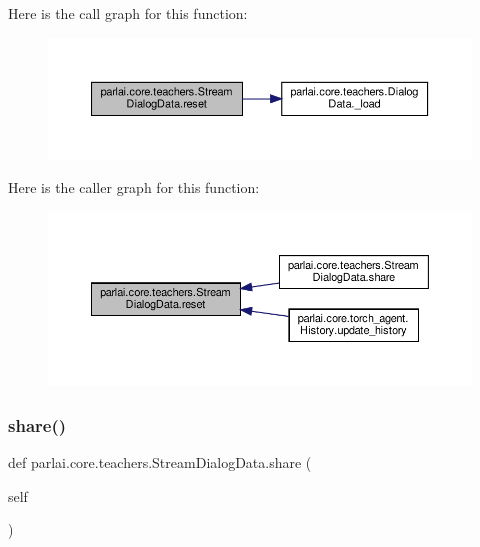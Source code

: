 Here is the call graph for this function\+:
\nopagebreak
\begin{figure}[H]
\begin{center}
\leavevmode
\includegraphics[width=350pt]{classparlai_1_1core_1_1teachers_1_1StreamDialogData_a6375bd13d685da4b3449caaafcc5ec13_cgraph}
\end{center}
\end{figure}
Here is the caller graph for this function\+:
\nopagebreak
\begin{figure}[H]
\begin{center}
\leavevmode
\includegraphics[width=350pt]{classparlai_1_1core_1_1teachers_1_1StreamDialogData_a6375bd13d685da4b3449caaafcc5ec13_icgraph}
\end{center}
\end{figure}
\mbox{\label{classparlai_1_1core_1_1teachers_1_1StreamDialogData_a6bb0ef8ed4a3360184f715e8fab9b3aa}} 
\subsubsection{\texorpdfstring{share()}{share()}}
{\footnotesize\ttfamily def parlai.\+core.\+teachers.\+Stream\+Dialog\+Data.\+share (\begin{DoxyParamCaption}\item[{}]{self }\end{DoxyParamCaption})}

